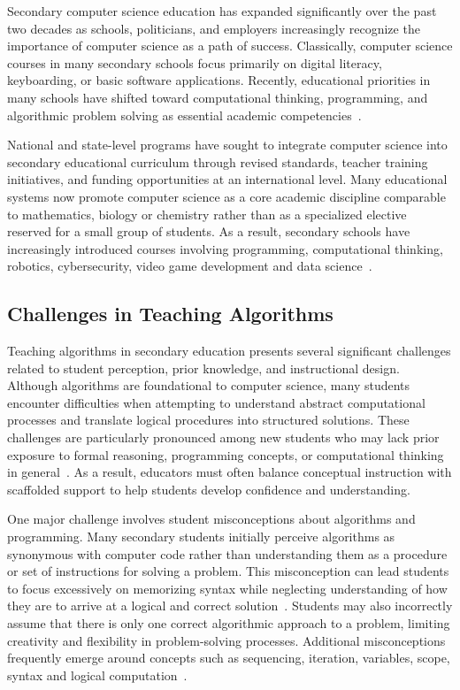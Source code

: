 \documentclass[../main.tex]{subfiles}
\begin{document}
Secondary computer science education has expanded significantly over the past two decades as schools, politicians, and employers increasingly
  recognize the importance of computer science as a path of success.
Classically, computer science courses in many secondary schools focus primarily on digital literacy, keyboarding, or basic software applications.
Recently, educational priorities in many schools have shifted toward computational thinking, programming, and algorithmic problem solving as
  essential academic competencies~\cite{yadav2016computational}.

National and state-level programs have sought to integrate computer science into secondary educational curriculum through revised standards, teacher
  training initiatives, and funding opportunities at an international level.
Many educational systems now promote computer science as a core academic discipline comparable to mathematics, biology or chemistry rather than as a
  specialized elective reserved for a small group of students.
As a result, secondary schools have increasingly introduced courses involving programming, computational thinking, robotics, cybersecurity, video
  game development and data science~\cite{yadav2016computational}.

\subsection{Challenges in Teaching Algorithms}

Teaching algorithms in secondary education presents several significant challenges related to student perception, prior knowledge, and instructional
  design.
Although algorithms are foundational to computer science, many students encounter difficulties when attempting to understand abstract computational
  processes and translate logical procedures into structured solutions.
These challenges are particularly pronounced among new students who may lack prior exposure to formal reasoning, programming concepts, or
  computational thinking in general~\cite{nijenhuis2023teaching}.
As a result, educators must often balance conceptual instruction with scaffolded support to help students develop confidence and understanding.

One major challenge involves student misconceptions about algorithms and programming.
Many secondary students initially perceive algorithms as synonymous with computer code rather than understanding them as a procedure or set of
  instructions for solving a problem.
This misconception can lead students to focus excessively on memorizing syntax while neglecting understanding of how they are to arrive at a logical
  and correct solution~\cite{gal2004efficiency}.
Students may also incorrectly assume that there is only one correct algorithmic approach to a problem, limiting creativity and flexibility in
  problem-solving processes.
Additional misconceptions frequently emerge around concepts such as sequencing, iteration, variables, scope, syntax and logical
  computation~\cite{futschek2006algorithmic}\cite{grover2017assessing}.
\end{document}
